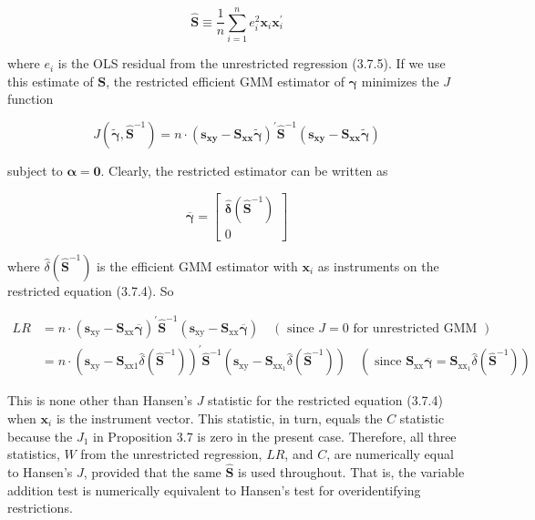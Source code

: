 \documentclass[10pt]{article}
\begin{document}
\begin{equation*}
\widehat{\mathbf{S}} \equiv \frac{1}{n} \sum_{i=1}^{n} e_{i}^{2} \mathbf{x}_{i} \mathbf{x}_{i}^{\prime} \tag{3.7.6}
\end{equation*}


where $e_{i}$ is the OLS residual from the unrestricted regression (3.7.5). If we use this estimate of $\mathbf{S}$, the restricted efficient GMM estimator of $\boldsymbol{\gamma}$ minimizes the $J$ function

$$
J\left(\tilde{\boldsymbol{\gamma}}, \widehat{\mathbf{S}}^{-1}\right)=n \cdot\left(\mathbf{s}_{\mathbf{x y}}-\mathbf{S}_{\mathbf{x x}} \tilde{\boldsymbol{\gamma}}\right)^{\prime} \widehat{\mathbf{S}}^{-1}\left(\mathbf{s}_{\mathbf{x y}}-\mathbf{S}_{\mathbf{x x}} \tilde{\boldsymbol{\gamma}}\right)
$$

subject to $\boldsymbol{\alpha}=\mathbf{0}$. Clearly, the restricted estimator can be written as

$$
\overline{\boldsymbol{\gamma}}=\left[\begin{array}{c}
\hat{\boldsymbol{\delta}}\left(\widehat{\mathbf{S}}^{-1}\right) \\
0
\end{array}\right]
$$

where $\hat{\delta}\left(\widehat{\mathbf{S}}^{-1}\right)$ is the efficient GMM estimator with $\mathbf{x}_{i}$ as instruments on the restricted equation (3.7.4). So

$$
\begin{aligned}
L R & =n \cdot\left(\mathbf{s}_{\mathrm{xy}}-\mathbf{S}_{\mathrm{xx}} \overline{\boldsymbol{\gamma}}\right)^{\prime} \widehat{\mathbf{S}}^{-1}\left(\mathbf{s}_{\mathrm{xy}}-\mathbf{S}_{\mathrm{xx}} \overline{\boldsymbol{\gamma}}\right) \quad(\text { since } J=0 \text { for unrestricted GMM }) \\
& =n \cdot\left(\mathbf{s}_{\mathrm{xy}}-\mathbf{S}_{\mathrm{xx} 1} \hat{\delta}\left(\widehat{\mathbf{S}}^{-1}\right)\right)^{\prime} \widehat{\mathbf{S}}^{-1}\left(\mathbf{s}_{\mathrm{xy}}-\mathbf{S}_{\mathrm{xx}_{1}} \hat{\delta}\left(\widehat{\mathbf{S}}^{-1}\right)\right) \quad\left(\text { since } \mathbf{S}_{\mathrm{xx}} \overline{\boldsymbol{\gamma}}=\mathbf{S}_{\mathrm{xx}_{1}} \hat{\delta}\left(\widehat{\mathbf{S}}^{-1}\right)\right)
\end{aligned}
$$

This is none other than Hansen's $J$ statistic for the restricted equation (3.7.4) when $\mathbf{x}_{i}$ is the instrument vector. This statistic, in turn, equals the $C$ statistic because the $J_{1}$ in Proposition 3.7 is zero in the present case. Therefore, all three statistics, $W$ from the unrestricted regression, $L R$, and $C$, are numerically equal to Hansen's $J$, provided that the same $\widehat{\mathbf{S}}$ is used throughout. That is, the variable addition test is numerically equivalent to Hansen's test for overidentifying restrictions.
\end{document}
